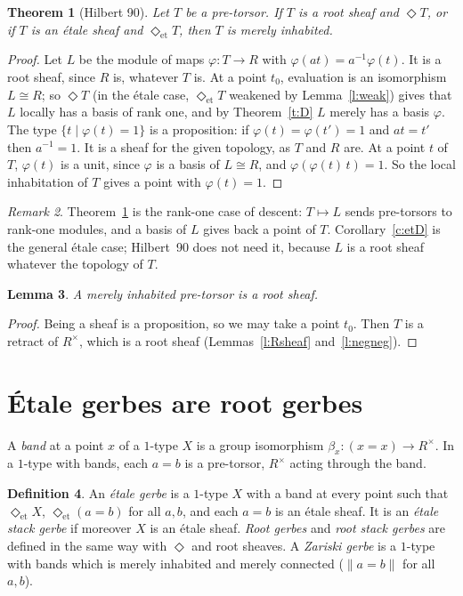 \documentclass[11pt]{amsart}
\newtheorem{theorem}{Theorem}[section]
\newtheorem{lemma}[theorem]{Lemma}
\theoremstyle{definition}
\newtheorem{definition}[theorem]{Definition}
\theoremstyle{remark}
\newtheorem{remark}[theorem]{Remark}
\newcommand{\close}{\Diamond}
\newcommand{\closeE}{\Diamond_{\mathrm{et}}}
\newcommand{\tr}[1]{\|#1\|}
\newcommand{\Rx}{R^\times}
\begin{document}
\begin{theorem}[Hilbert 90]\label{t:h90}
Let $T$ be a pre-torsor. If $T$ is a root sheaf and $\close T$, or if $T$
is an \'etale sheaf and $\closeE T$, then $T$ is merely inhabited.
\end{theorem}
\begin{proof}
Let $L$ be the module of maps $\varphi:T\to R$ with
$\varphi(at)=a^{-1}\varphi(t)$. It is a root sheaf, since $R$ is,
whatever $T$ is. At a point $t_0$, evaluation is an isomorphism $L\cong
R$; so $\close T$ (in the \'etale case, $\closeE T$ weakened by
Lemma~\ref{l:weak}) gives that $L$ locally has a basis of rank one, and
by Theorem~\ref{t:D} $L$ merely has a basis $\varphi$. The type
$\{t\mid\varphi(t)=1\}$ is a proposition: if $\varphi(t)=\varphi(t')=1$
and $at=t'$ then $a^{-1}=1$. It is a sheaf for the given topology, as
$T$ and $R$ are. At a point $t$ of $T$, $\varphi(t)$ is a unit, since
$\varphi$ is a basis of $L\cong R$, and $\varphi(\varphi(t)\,t)=1$. So the
local inhabitation of $T$ gives a point with $\varphi(t)=1$.
\end{proof}

\begin{remark}
Theorem~\ref{t:h90} is the rank-one case of descent: $T\mapsto L$ sends
pre-torsors to rank-one modules, and a basis of $L$ gives back a point of
$T$. Corollary~\ref{c:etD} is the general \'etale case; Hilbert~90 does
not need it, because $L$ is a root sheaf whatever the topology of $T$.
\end{remark}

\begin{lemma}\label{l:paths}
A merely inhabited pre-torsor is a root sheaf.
\end{lemma}
\begin{proof}
Being a sheaf is a proposition, so we may take a point $t_0$. Then $T$ is a
retract of $\Rx$, which is a root sheaf (Lemmas~\ref{l:Rsheaf}
and~\ref{l:negneg}).
\end{proof}

\section{\'Etale gerbes are root gerbes}

A \emph{band} at a point $x$ of a $1$-type $X$ is a group isomorphism
$\beta_x:(x=x)\to\Rx$. In a $1$-type with bands, each $a=b$ is a
pre-torsor, $\Rx$ acting through the band.

\begin{definition}
An \emph{\'etale gerbe} is a $1$-type $X$ with a band at every point such
that $\closeE X$, $\closeE(a=b)$ for all $a,b$, and each $a=b$ is an
\'etale sheaf. It is an \emph{\'etale stack gerbe} if moreover $X$ is an
\'etale sheaf. \emph{Root gerbes} and \emph{root stack gerbes} are defined in
the same way with $\close$ and root sheaves. A \emph{Zariski gerbe} is a
$1$-type with bands which is merely inhabited and merely connected
($\tr{a=b}$ for all $a,b$).
\end{definition}
\end{document}
